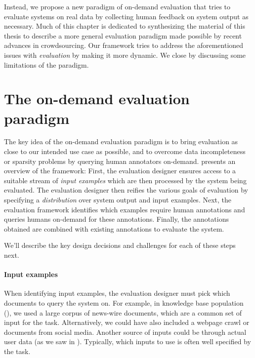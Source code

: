 Instead, we propose a new paradigm of on-demand evaluation that tries to evaluate systems on real data by collecting human feedback on system output as necessary.
Much of this chapter is dedicated to synthesizing the material of this thesis to describe a more general evaluation paradigm made possible by recent advances in crowdsourcing.
Our framework tries to address the aforementioned issues with \textit{evaluation} by making it more dynamic.
We close by discussing some limitations of the paradigm.

\section{The on-demand evaluation paradigm}

The key idea of the on-demand evaluation paradigm is to bring evaluation as close to our intended use case as possible, and to overcome data incompleteness or sparsity problems by querying human annotators on-demand.
 presents an overview of the framework: 
First, the evaluation designer ensures access to a suitable stream of \textit{input examples}
which are then processed by the system being evaluated.
The evaluation designer then reifies the various goals of evaluation by specifying a \textit{distribution} over system output and input examples.
Next, the evaluation framework identifies which examples require human annotations and queries humans on-demand for these annotations. 
Finally, the annotations obtained are combined with existing annotations to evaluate the system.

We'll describe the key design decisions and challenges for each of these steps next.

\paragraph{Input examples}
When identifying input examples, the evaluation designer must pick which documents to query the system on.
For example, in knowledge base population (), we used a large corpus of news-wire documents, which are a common set of input for the task.
Alternatively, we could have also included a webpage crawl or documents from social media.
Another source of inputs could be through actual user data (as we saw in ).
Typically, which inputs to use is often well specified by the task.

